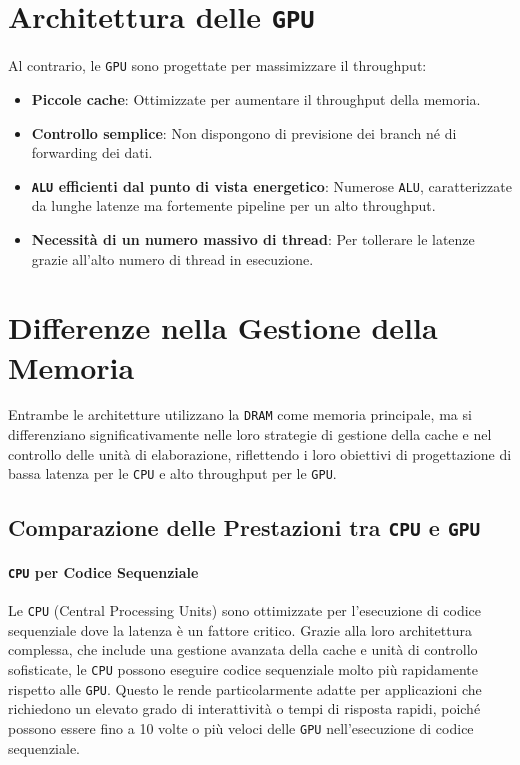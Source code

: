 \section{Architettura delle \texttt{GPU}}
Al contrario, le \texttt{GPU} sono progettate per massimizzare il throughput:
\begin{itemize}
    \item \textbf{Piccole cache}: Ottimizzate per aumentare il throughput della memoria.
    \item \textbf{Controllo semplice}: Non dispongono di previsione dei branch né di forwarding dei dati.
    \item \textbf{\texttt{ALU} efficienti dal punto di vista energetico}: Numerose \texttt{ALU}, caratterizzate da lunghe latenze ma fortemente pipeline per un alto throughput.
    \item \textbf{Necessità di un numero massivo di thread}: Per tollerare le latenze grazie all'alto numero di thread in esecuzione.
\end{itemize}

\section{Differenze nella Gestione della Memoria}
Entrambe le architetture utilizzano la \texttt{DRAM} come memoria principale,
ma si differenziano significativamente nelle loro strategie di gestione della
cache e nel controllo delle unità di elaborazione, riflettendo i loro obiettivi
di progettazione di bassa latenza per le \texttt{CPU} e alto throughput per
le \texttt{GPU}.

\subsection{Comparazione delle Prestazioni tra \texttt{CPU} e \texttt{GPU}}

\paragraph{\texttt{CPU} per Codice Sequenziale}
Le \texttt{CPU} (Central Processing Units) sono ottimizzate per l'esecuzione
di codice sequenziale dove la latenza è un fattore critico. Grazie alla loro
architettura complessa, che include una gestione avanzata della cache e unità
di controllo sofisticate, le \texttt{CPU} possono eseguire codice sequenziale
molto più rapidamente rispetto alle \texttt{GPU}. Questo le rende particolarmente
adatte per applicazioni che richiedono un elevato grado di interattività o tempi
di risposta rapidi, poiché possono essere fino a 10 volte o più veloci delle
\texttt{GPU} nell'esecuzione di codice sequenziale.

